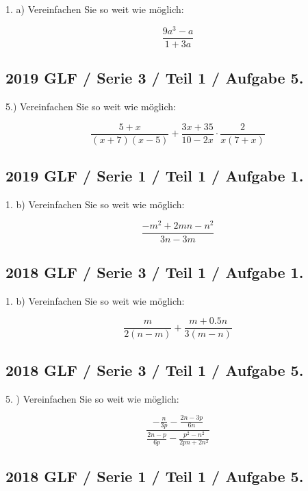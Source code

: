 1. a) Vereinfachen Sie so weit wie möglich:

$$\frac{9a^3-a}{1+3a}$$


\subsection*{2019 GLF / Serie 3 / Teil 1 / Aufgabe 5.}

5.) Vereinfachen Sie so weit wie möglich:

$$\frac{5+x}{(x+7)(x-5)} + \frac{3x+35}{10-2x} \cdot{} \frac2{x(7+x)}$$


\subsection*{2019 GLF / Serie 1 / Teil 1 / Aufgabe 1.}

1. b) Vereinfachen Sie so weit wie möglich:

$$\frac{-m^2+2mn-n^2}{3n-3m}$$



\subsection*{2018 GLF / Serie 3 / Teil 1 / Aufgabe 1.}

1. b) Vereinfachen Sie so weit wie möglich:

$$\frac{m}{2(n-m)} + \frac{m+0.5n}{3(m-n)}$$



\subsection*{2018 GLF / Serie 3 / Teil 1 / Aufgabe 5.}

5. ) Vereinfachen Sie so weit wie möglich:

$$\frac{- \frac{n}{3p} - \frac{2n-3p}{6n}}{\frac{2n-p}{6p} - \frac{p^2-n^2}{2pn+2n^2}}$$


\subsection*{2018 GLF / Serie 1 / Teil 1 / Aufgabe 5.}

